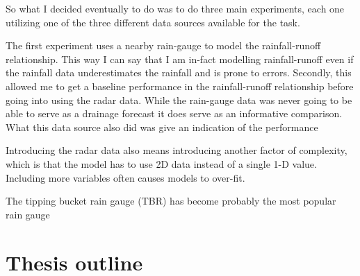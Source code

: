 So what I decided eventually to do was to do three main experiments, each one utilizing one of the three different data sources available for the task. 

The first experiment uses a nearby rain-gauge to model the rainfall-runoff relationship. This way I can say that I am in-fact modelling rainfall-runoff even if the rainfall data underestimates the rainfall and is prone to errors. Secondly, this allowed me to get a baseline performance in the rainfall-runoff relationship before going into using the radar data. While the rain-gauge data was never going to be able to serve as a drainage forecast it does serve as an informative comparison. What this data source also did was give an indication of the performance

Introducing the radar data also means introducing another factor of complexity, which is that the model has to use 2D data instead of a single 1-D value. Including more variables often causes models to over-fit. 








The tipping bucket rain gauge (TBR) has become probably the most popular rain gauge




\section{Thesis outline}


